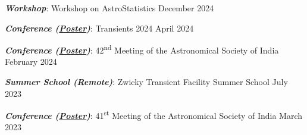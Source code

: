 \textbf{\textit{Workshop}}: Workshop on AstroStatistics \hfill December 2024


\textbf{\textit{Conference (\href{https://www.dropbox.com/scl/fi/aw33s2tmk6wsrwwbju25e/ASI-2024-poster.pdf?rlkey=aiasm86d2e3t40235q0knu635&st=3qr65pz8&dl=0}{Poster})}}: Transients 2024 \hfill April 2024

\textbf{\textit{Conference (\href{https://www.dropbox.com/scl/fi/aw33s2tmk6wsrwwbju25e/ASI-2024-poster.pdf?rlkey=aiasm86d2e3t40235q0knu635&st=3qr65pz8&dl=0}{Poster})}}: 42\textsuperscript{nd} Meeting of the Astronomical Society of India \hfill February 2024

\textbf{\textit{Summer School (Remote)}}: Zwicky Transient Facility Summer School \hfill July 2023

\textbf{\textit{Conference (\href{https://www.dropbox.com/scl/fi/2vxerkx3lhnbb6bgwactw/ASI-2023-Poster.pdf?rlkey=1hyjudte4bn1xf4sks47nb0c5&st=lc2jnnm0&dl=0}{Poster})}}: 41\textsuperscript{st} Meeting of the Astronomical Society of India \hfill March 2023


